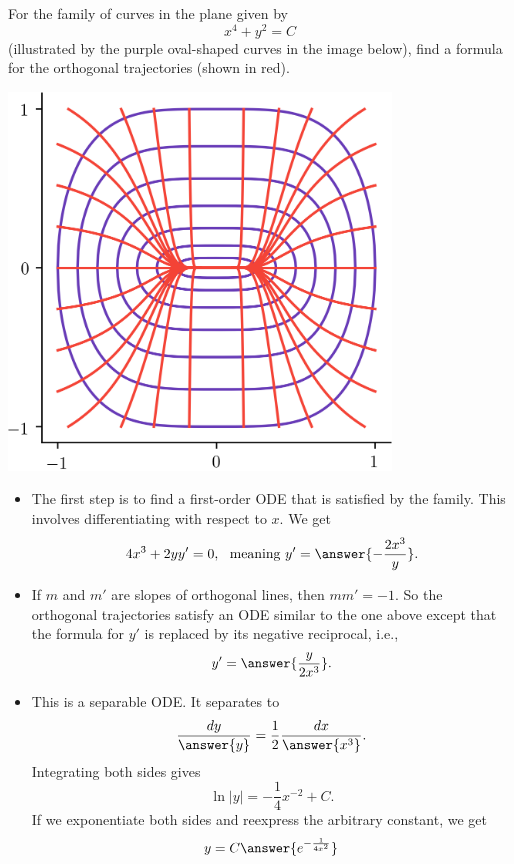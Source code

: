 \documentclass{ximera}
\begin{document}
\begin{example}
For the family of curves in the plane given by 
\[ x^4 + y^2 = C \]
(illustrated by the purple oval-shaped curves in the image below), 
find a formula for the orthogonal trajectories (shown in red).
\begin{center}
\begin{image}
\includegraphics[width=4in]{images/slopeX01.png}
\end{image}
\end{center}
\begin{itemize}
\item The first step is to find a first-order ODE that is satisfied by the family. This involves differentiating with respect to $x$. We get
\[ 4 x^3 + 2y y' = 0, \ \text{ meaning } y' = \answer{-\frac{2x^3}{y}}. \]
\item If $m$ and $m'$ are slopes of orthogonal lines, then $m m' = -1$. So the orthogonal trajectories satisfy an ODE similar to the one above except that the formula for $y'$ is replaced by its negative reciprocal, i.e.,
\[ y' = \answer{\frac{y}{2x^3}}. \]
\item This is a separable ODE. It separates to
\[ \frac{dy}{\answer{y}} = \frac{1}{2} \frac{dx}{\answer{x^3}}. \]
Integrating both sides gives
\[ \ln |y| = - \frac{1}{4} x^{-2} + C. \]
If we exponentiate both sides and reexpress the arbitrary constant, we get
\[ y = C \answer{e^{-\frac{1}{4x^2}}} \]
\end{itemize}
\end{example}
\end{document}
